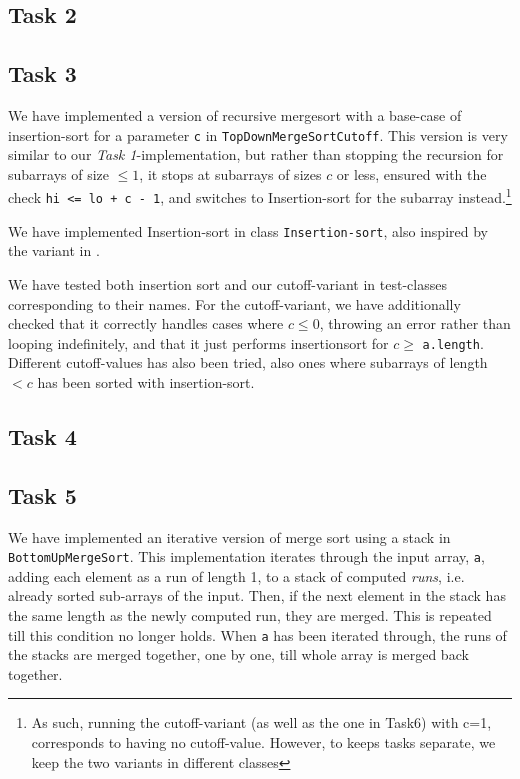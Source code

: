 \documentclass[11pt, a4paper]{article}
\begin{document}
\subsection{Task 2}

\subsection{Task 3}

We have implemented a version of recursive mergesort with a base-case of insertion-sort for a parameter \verb|c| in \verb|TopDownMergeSortCutoff|. This version is very similar to our \textit{Task 1}-implementation, but rather than stopping the recursion for subarrays of size $\leq 1$, it stops at subarrays of sizes $c$ or less, ensured with the check \verb|hi <= lo + c - 1|, and switches to Insertion-sort for the subarray instead.\footnote{As such, running the cutoff-variant (as well as the one in Task6) with c=1, corresponds to having no cutoff-value. However, to keeps tasks separate, we keep the two variants in different classes}

We have implemented Insertion-sort in class \verb|Insertion-sort|, also inspired by the variant in \cite{Sedgewick_Wayne_2011}. 

We have tested both insertion sort and our cutoff-variant in test-classes corresponding to their names. For the cutoff-variant, we have additionally checked that it correctly handles cases where $c\leq 0$, throwing an error rather than looping indefinitely, and that it just performs insertionsort for $c\geq$ \verb|a.length|. Different cutoff-values has also been tried, also ones where subarrays of length $< c$ has been sorted with insertion-sort.  

\subsection{Task 4}

\subsection{Task 5}

We have implemented an iterative version of merge sort using a stack in \verb|BottomUpMergeSort|. This implementation iterates through the input array, \verb|a|, adding each element as a run of length 1, to a stack of computed \textit{runs}, i.e. already sorted sub-arrays of the input. Then, if the next element in the stack has the same length as the newly computed run, they are merged. This is repeated till this condition no longer holds. 
When \verb|a| has been iterated through, the runs of the stacks are merged together, one by one, till whole array is merged back together.
\end{document}
